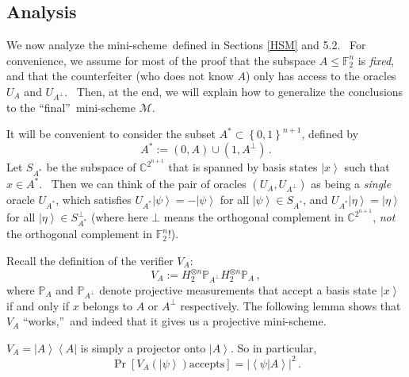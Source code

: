 \subsection{Analysis\label{ANALYSIS}}

We now analyze the mini-scheme\ defined in Sections \ref{HSM} and 5.2.
\ For convenience, we assume for most of the proof that the subspace
$A\leq\mathbb{F}_{2}^{n}$ is \emph{fixed}, and that the counterfeiter (who
does not know $A$) only has access to the oracles $U_{A}$ and $U_{A^{\bot}}$.
\ Then, at the end, we will explain how to generalize the conclusions to the
\textquotedblleft final\textquotedblright\ mini-scheme $\mathcal{M}$.

It will be convenient to consider the subset $A^{\ast}\subset\left\{
0,1\right\}  ^{n+1}$, defined by%
\[
A^{\ast}:=\left(  0,A\right)  \cup(1,A^{\bot})\,.
\]
Let $S_{A^{\ast}}$ be the subspace of $\mathbb{C}^{2^{n+1}}$ that is spanned
by basis states $\left\vert x\right\rangle $ such that $x\in A^{\ast}$.
\ Then we can think of the pair of oracles $\left(  U_{A},U_{A^{\bot}}\right)
$ as being a \emph{single} oracle $U_{A^{\ast}}$, which satisfies
$U_{A^{\ast}}\left\vert \psi\right\rangle =-\left\vert \psi\right\rangle
$ for all $\left\vert \psi\right\rangle \in S_{A^{\ast}}$, and $U_{A^{\ast}%
}\left\vert \eta\right\rangle =\left\vert \eta\right\rangle $ for all
$\left\vert \eta\right\rangle \in S_{A^{\ast}}^{\bot}$ (where here $\bot
$ means the orthogonal complement in $\mathbb{C}^{2^{n+1}}$, \emph{not} the
orthogonal complement in $\mathbb{F}_{2}^{n}$!).

Recall the definition of the verifier $V_{A}$:%
\[
V_{A}:=H_{2}^{\otimes n}\mathbb{P}_{A^{\bot}}H_{2}^{\otimes n}\mathbb{P}_{A}\,,
\]
where $\mathbb{P}_{A}$ and $\mathbb{P}_{A^{\bot}}$ denote projective
measurements that accept a basis state $\left\vert x\right\rangle $ if and
only if $x$ belongs to $A$ or $A^{\bot}$ respectively. The following lemma
shows that $V_{A}$ \textquotedblleft works,\textquotedblright\ and indeed that
it gives us a projective mini-scheme.

\begin{lemma}
\label{testworks}$V_{A}=\left\vert A\right\rangle \left\langle A\right\vert $
is simply a projector onto $\left\vert A\right\rangle $. So in particular,
\[
\Pr\left[  V_{A}\left(  \left\vert \psi\right\rangle \right)  \text{
accepts}\right]  =\left\vert \left\langle \psi|A\right\rangle \right\vert
^{2}\,.
\]
\end{lemma}

